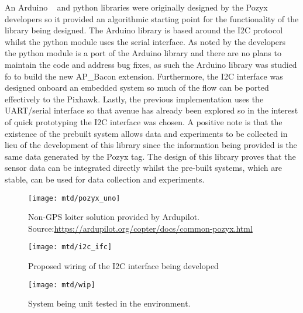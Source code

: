 An Arduino ~\cite{pozarduino} and python libraries were originally designed by the Pozyx developers so it provided an algorithmic starting point for the functionality of the library being designed.
The Arduino library is based around the I2C protocol whilst the python module uses the serial interface.
As noted by the developers the python module is a port of the Arduino library and there are no plans to maintain the code and address bug fixes, as such the Arduino library was studied fo to build the new AP\_Bacon extension.
Furthermore, the I2C interface was designed onboard an embedded system so much of the flow can be ported effectively to the Pixhawk.
Lastly, the previous implementation uses the UART/serial interface so that avenue has already been explored so in the interest of quick prototyping the I2C interface was chosen.
A positive note is that the existence of the prebuilt system allows data and experiments to be collected in lieu of the development of this library since the information being provided is the same data generated by the Pozyx tag.
The design of this library proves that the sensor data can be integrated directly whilst the pre-built systems, which are stable, can be used for data collection and experiments.
%


\begin{figure}[ht!]
    \centering
    \texttt{[image: mtd/pozyx\_uno]}
    \caption{Non-GPS loiter solution provided by Ardupilot.
    Source:\url{https://ardupilot.org/copter/docs/common-pozyx.html}}
\end{figure}

\begin{figure}[ht!]
    \centering
    \texttt{[image: mtd/i2c\_ifc]}
    \caption{Proposed wiring of the I2C interface being developed}
\end{figure}

\begin{figure}[ht!]
    \centering
    \texttt{[image: mtd/wip]}
    \caption{System being unit tested in the environment.}
\end{figure}
\newpage
